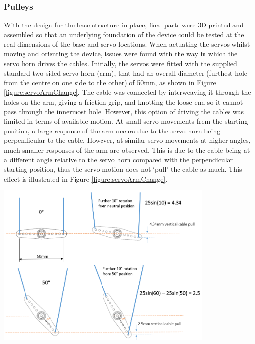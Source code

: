 \documentclass[11pt]{article}
\begin{document}
\subsubsection{Pulleys}
With the design for the base structure in place, final parts were 3D printed and assembled so that an underlying foundation of the device could be tested at the real dimensions of the base and servo locations. When actuating the servos whilst moving and orienting the device, issues were found with the way in which the servo horn drives the cables. Initially, the servos were fitted with the supplied standard two-sided servo horn (arm), that had an overall diameter (furthest hole from the centre on one side to the other) of 50mm, as shown in Figure \ref{figure:servoArmChange}. The cable was connected by interweaving it through the holes on the arm, giving a friction grip, and knotting the loose end so it cannot pass through the innermost hole. However, this option of driving the cables was limited in terms of available motion. At small servo movements from the starting position, a large response of the arm occurs due to the servo horn being perpendicular to the cable. However, at similar servo movements at higher angles, much smaller responses of the arm are observed. This is due to the cable being at a different angle relative to the servo horn compared with the perpendicular starting position, thus the servo motion does not `pull' the cable as much. This effect is illustrated in Figure \ref{figure:servoArmChange}.


\begin{center}
\includegraphics[width=0.8\textwidth]{images/servoArmChange.png}
\label{figure:servoArmChange}
\end{center}
\end{document}
